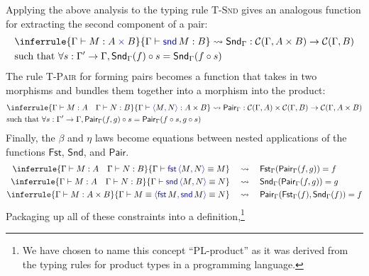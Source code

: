 Applying the above analysis to the typing rule \textsc{T-Snd}
gives an analogous function for extracting the second component of a pair:
\begin{align*}
  &\inferrule
    {\Gamma \vdash M : A \pltimes B}
    {\Gamma \vdash \plsnd{M} : B}
    \rightsquigarrow
    \mathsf{Snd}_\Gamma : \calC(\Gamma, A \times B) \to \calC(\Gamma, B)
    \\
  &\text{such that }\forall s : \Gamma' \to \Gamma,
    \mathsf{Snd}_\Gamma(f)\circ s = \mathsf{Snd}_\Gamma(f \circ s)
\end{align*}
The rule \textsc{T-Pair} for forming pairs becomes a function
that takes in two morphisms and bundles them together into a morphism into the product:
\begin{align*}
  &\inferrule
    {\Gamma \vdash M : A \quad
      \Gamma \vdash N : B }
    {\Gamma \vdash \plpair{M}{N} : A \times B}
    \rightsquigarrow
    \mathsf{Pair}_\Gamma : \calC(\Gamma, A) \times \calC(\Gamma, B) 
    \to \calC(\Gamma, A \times B)
\\
   &\text{such that }\forall s : \Gamma' \to \Gamma,
    \mathsf{Pair}_\Gamma(f, g)\circ s = \mathsf{Pair}_\Gamma(f \circ s, g \circ s)
\end{align*}
Finally, the $\beta$ and $\eta$ laws become equations between nested applications of the functions \(\mathsf{Fst}\), \(\mathsf{Snd}\),
and \(\mathsf{Pair}\).
\begin{align*}
  \inferrule
    {\Gamma \vdash M : A \quad
      \Gamma \vdash N : B }
    {\Gamma \vdash \plfst{\plpair{M}{N}} \equiv M}
    &\quad\rightsquigarrow\quad
    \mathsf{Fst}_\Gamma(\mathsf{Pair}_\Gamma(f,g)) = f
\\
  \inferrule
    {\Gamma \vdash M : A \quad
      \Gamma \vdash N : B }
    {\Gamma \vdash \plsnd{\plpair{M}{N}} \equiv N}
    &\quad\rightsquigarrow\quad
    \mathsf{Snd}_\Gamma(\mathsf{Pair}_\Gamma(f,g)) = g
\\
  \inferrule
    {\Gamma \vdash M : A \times B}
    {\Gamma \vdash M \equiv \plpair{\plfst{M}}{\plsnd{M}} \equiv N}
    &\quad\rightsquigarrow\quad
    \mathsf{Pair}_\Gamma(\mathsf{Fst}_\Gamma(f), \mathsf{Snd}_\Gamma(f)) = f
\end{align*}
Packaging up all of these constraints into a definition,\footnote{We have chosen to name this concept ``PL-product'' as it was derived from the typing rules for product types in a programming language.}
